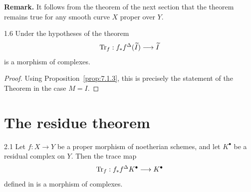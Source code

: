 \par\medskip\noindent\textbf{Remark.}
It follows from the theorem of the next section that the theorem remains true for any smooth curve $X$ proper over $Y$.
\par\medskip

\begin{bookcorollary}{1.6}\label{cor:7.1.6}
Under the hypotheses of the theorem
\[
\operatorname{Tr}_{f}: f_{*}f^{\Delta}(\widetilde{I}) \longrightarrow \widetilde{I}
\]
is a morphism of complexes.
\end{bookcorollary}

\begin{proof}
Using Proposition~\ref{prop:7.1.3}, this is precisely the statement of the Theorem in the case $M = I$.
\end{proof}

\section{The residue theorem}\label{sec:7.2}

\begin{booktheorem}{2.1}\label{thm:7.2.1} Let $f: X \to Y$ be a proper morphism of noetherian schemes, and let $K^{\bullet}$ be a residual complex on $Y$. Then the trace map
\[
\operatorname{Tr}_{f}: f_{*}f^{\Delta}K^{\bullet} \longrightarrow K^{\bullet}
\]
defined in  is a morphism of complexes.
\end{booktheorem}

